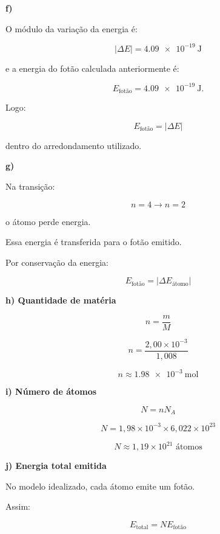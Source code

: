 \documentclass[11pt,a4paper]{article}
\begin{document}
\begin{tcolorbox}[
		enhanced,
		breakable,
		colback=eulightorange,
		colframe=euorange,
		title=\textbf{Resolução},
		fonttitle=\bfseries
		]
		\textbf{f)}
		
		O módulo da variação da energia é:
		
		\[
		|\Delta E|
		=
		\SI{4,09e-19}{\joule}
		\]
		
		e a energia do fotão calculada anteriormente é:
		
		\[
		E_{\text{fotão}}
		=
		\SI{4,09e-19}{\joule}.
		\]
		
		Logo:
		
		\[
		\boxed{
			E_{\text{fotão}}
			=
			|\Delta E|
		}
		\]
		
		dentro do arredondamento utilizado.
		
		\vspace{3mm}
		
		\textbf{g)}
		
		Na transição:
		
		\[
		n=4\rightarrow n=2
		\]
		
		o átomo perde energia.
		
		Essa energia é transferida para o fotão emitido.
		
		Por conservação da energia:
		
		\[
		\boxed{
			E_{\text{fotão}}
			=
			|\Delta E_{\text{átomo}}|
		}
		\]
		
		\vspace{3mm}
		
		\textbf{h) Quantidade de matéria}
		
		\[
		n=\frac{m}{M}
		\]
		
		\[
		n=
		\frac{2,00\times10^{-3}}
		{1,008}
		\]
		
		\[
		\boxed{
			n\approx\SI{1,98e-3}{\mole}
		}
		\]
		
		\vspace{3mm}
		
		\textbf{i) Número de átomos}
		
		\[
		N=nN_A
		\]
		
		\[
		N=
		1,98\times10^{-3}
		\times
		6,022\times10^{23}
		\]
		
		\[
		\boxed{
			N\approx1,19\times10^{21}
			\text{ átomos}
		}
		\]
		
		\vspace{3mm}
		
		\textbf{j) Energia total emitida}
		
		No modelo idealizado, cada átomo emite um fotão.
		
		Assim:
		
		\[
		E_{\text{total}}
		=
		NE_{\text{fotão}}
		\]
		

\end{tcolorbox}
\end{document}
